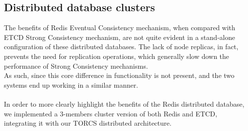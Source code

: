 \subsection{Distributed database clusters}\label{ddb-clusters}
The benefits of Redis Eventual Consistency mechanism, when compared with ETCD Strong Consistency mechanism, are not quite evident in a stand-alone configuration of these distributed databases. The lack of node replicas, in fact, prevents the need for replication operations, which generally slow down the performance of Strong Consistency mechanisms. \\
As such, since this core difference in functionality is not present, and the two systems end up working in a similar manner. \\ \\
In order to more clearly highlight the benefits of the Redis distributed database, we implemented a 3-members cluster version of both Redis and ETCD, integrating it with our TORCS distributed architecture.

